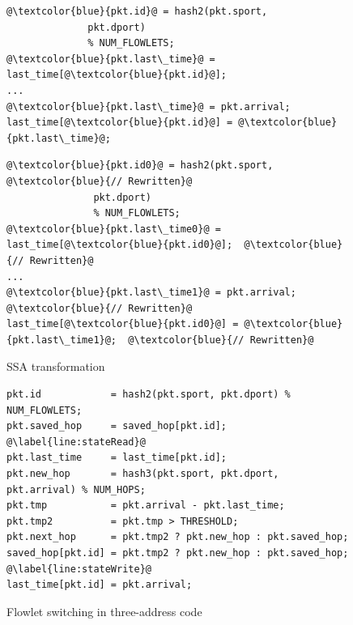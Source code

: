 \begin{figure}[!t]
  \begin{minipage}{0.43\textwidth}
  \begin{small}
  \begin{lstlisting}[style=customc]
@\textcolor{blue}{pkt.id}@ = hash2(pkt.sport,
              pkt.dport)
              % NUM_FLOWLETS;
@\textcolor{blue}{pkt.last\_time}@ = last_time[@\textcolor{blue}{pkt.id}@];
...
@\textcolor{blue}{pkt.last\_time}@ = pkt.arrival;
last_time[@\textcolor{blue}{pkt.id}@] = @\textcolor{blue}{pkt.last\_time}@;
  \end{lstlisting}
  \end{small}
  \end{minipage}
  \begin{minipage}{0.57\textwidth}
  \begin{small}
  \begin{lstlisting}[style=customc]
@\textcolor{blue}{pkt.id0}@ = hash2(pkt.sport, @\textcolor{blue}{// Rewritten}@
               pkt.dport)
               % NUM_FLOWLETS;
@\textcolor{blue}{pkt.last\_time0}@ = last_time[@\textcolor{blue}{pkt.id0}@];  @\textcolor{blue}{// Rewritten}@
...
@\textcolor{blue}{pkt.last\_time1}@ = pkt.arrival;  @\textcolor{blue}{// Rewritten}@
last_time[@\textcolor{blue}{pkt.id0}@] = @\textcolor{blue}{pkt.last\_time1}@;  @\textcolor{blue}{// Rewritten}@
  \end{lstlisting}
  \end{small}
  \end{minipage}
  \caption{SSA transformation}
\label{fig:ssa}
\end{figure}

\begin{figure}[!t]
\begin{lstlisting}[style=customc]
pkt.id            = hash2(pkt.sport, pkt.dport) % NUM_FLOWLETS;
pkt.saved_hop     = saved_hop[pkt.id]; @\label{line:stateRead}@
pkt.last_time     = last_time[pkt.id];
pkt.new_hop       = hash3(pkt.sport, pkt.dport, pkt.arrival) % NUM_HOPS;
pkt.tmp           = pkt.arrival - pkt.last_time;
pkt.tmp2          = pkt.tmp > THRESHOLD;
pkt.next_hop      = pkt.tmp2 ? pkt.new_hop : pkt.saved_hop;
saved_hop[pkt.id] = pkt.tmp2 ? pkt.new_hop : pkt.saved_hop; @\label{line:stateWrite}@
last_time[pkt.id] = pkt.arrival;
\end{lstlisting}
\caption{Flowlet switching in three-address code}
\label{fig:three_address}
\end{figure}

